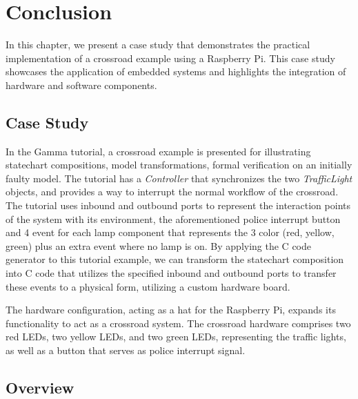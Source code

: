 \chapter{Conclusion}

In this chapter, we present a case study that demonstrates the practical implementation of a crossroad example using a Raspberry Pi. This case study showcases the application of embedded systems and highlights the integration of hardware and software components.

\section{Case Study}

In the Gamma tutorial, a crossroad example is presented for illustrating statechart compositions, model transformations, formal verification on an initially faulty model. The tutorial has a \textit{Controller} that synchronizes the two \textit{TrafficLight} objects, and provides a way to interrupt the normal workflow of the crossroad. The tutorial uses inbound and outbound ports to represent the interaction points of the system with its environment, the aforementioned police interrupt button and 4 event for each lamp component that represents the 3 color (red, yellow, green) plus an extra event where no lamp is on. By applying the C code generator to this tutorial example, we can transform the statechart composition into C code that utilizes the specified inbound and outbound ports to transfer these events to a physical form, utilizing a custom hardware board.

The hardware configuration, acting as a hat for the Raspberry Pi, expands its functionality to act as a crossroad system. The crossroad hardware comprises two red LEDs, two yellow LEDs, and two green LEDs, representing the traffic lights, as well as a button that serves as police interrupt signal.

\section{Overview}

